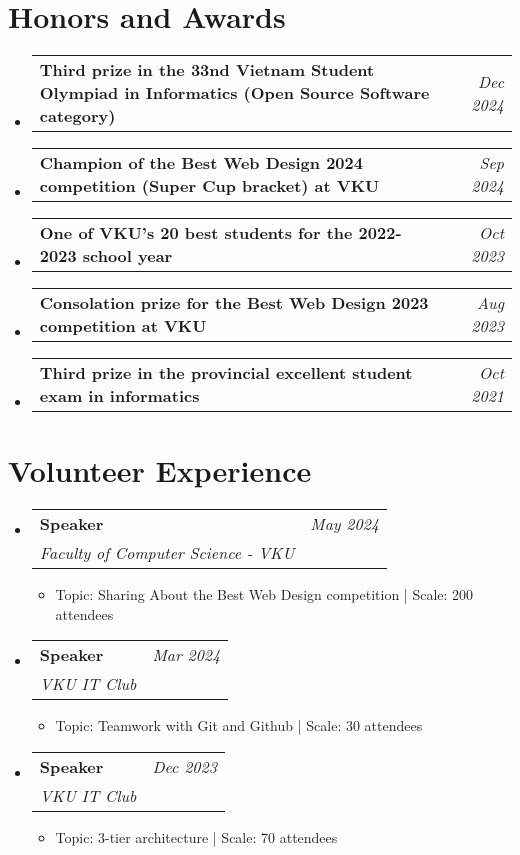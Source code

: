 \documentclass[a4paper,11pt]{article}
\makeatletter
\newcommand{\resumeProject}[4]{
\vspace{0.5mm}\item
    \begin{tabular*}{0.98\textwidth}[t]{l@{\extracolsep{\fill}}r}
        \textbf{#1} & \textit{\footnotesize{#3}} \\
        \footnotesize{\textit{#2}} & \footnotesize{#4}
    \end{tabular*}
    \vspace{-2.4mm}
}
\newcommand{\resumeTextAndDate}[2]{
    \vspace{0.5mm}\item
    \begin{tabular*}{0.98\textwidth}[t]{l@{\extracolsep{\fill}}r}
        \textbf{#1} & \textit{\footnotesize{#2}} \\
    \end{tabular*}
    \vspace{-2.4mm}
}
\newcommand{\resumeSubHeadingListStart}{\begin{itemize}[leftmargin=*,labelsep=1mm]}
\newcommand{\resumeItemListStart}{\begin{itemize}[leftmargin=*,labelsep=1mm,itemsep=0.5mm]}
\newcommand{\resumeSubHeadingListEnd}{\end{itemize}\vspace{2mm}}
\newcommand{\resumeItemListEnd}{\end{itemize}\vspace{-2mm}}
\makeatother
\begin{document}
\section{\textbf{Honors and Awards}}
\vspace{-0.4mm}
\resumeSubHeadingListStart

\resumeTextAndDate
{Third prize in the 33nd Vietnam Student Olympiad in Informatics (Open Source Software category)}
{Dec 2024}


\resumeTextAndDate
{Champion of the Best Web Design 2024 competition (Super Cup bracket) at VKU}
{Sep 2024}

\resumeTextAndDate
{One of VKU's 20 best students for the 2022-2023 school year}
{Oct 2023}

\resumeTextAndDate
{Consolation prize for the Best Web Design 2023 competition at VKU}
{Aug 2023}

\resumeTextAndDate
{Third prize in the provincial excellent student exam in informatics}
{Oct 2021}


\resumeSubHeadingListEnd

\vspace{-6mm}

\section{\textbf{Volunteer Experience}}
\vspace{-0.4mm}
\resumeSubHeadingListStart
\resumeProject
{Speaker}
{Faculty of Computer Science - VKU}
{May 2024}
{{}}
\resumeItemListStart
\item Topic: Sharing About the Best Web Design competition | Scale: 200 attendees

\resumeItemListEnd

\vspace{-2mm}

\resumeProject
{Speaker}
{VKU IT Club}
{Mar 2024}
{{}}
\resumeItemListStart
\item Topic: Teamwork with Git and Github | Scale: 30 attendees
\resumeItemListEnd

\vspace{-2mm}

\resumeProject
{Speaker}
{VKU IT Club}
{Dec 2023}
{{}}
\resumeItemListStart
\item Topic: 3-tier architecture | Scale: 70 attendees
\resumeItemListEnd

\resumeSubHeadingListEnd
\vspace{-6mm}
\end{document}
